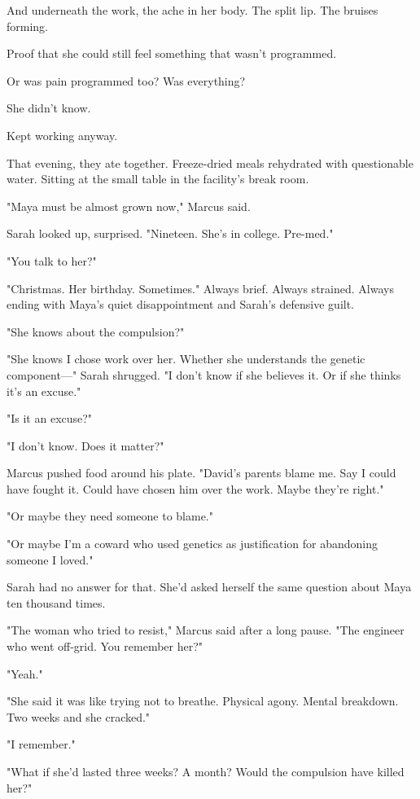 And underneath the work, the ache in her body. The split lip. The bruises forming.

Proof that she could still feel something that wasn't programmed.

Or was pain programmed too? Was everything?

She didn't know.

Kept working anyway.

\scenebreak

That evening, they ate together. Freeze-dried meals rehydrated with questionable water. Sitting at the small table in the facility's break room.

"Maya must be almost grown now," Marcus said.

Sarah looked up, surprised. "Nineteen. She's in college. Pre-med."

"You talk to her?"

"Christmas. Her birthday. Sometimes." Always brief. Always strained. Always ending with Maya's quiet disappointment and Sarah's defensive guilt.

"She knows about the compulsion?"

"She knows I chose work over her. Whether she understands the genetic component—" Sarah shrugged. "I don't know if she believes it. Or if she thinks it's an excuse."

"Is it an excuse?"

"I don't know. Does it matter?"

Marcus pushed food around his plate. "David's parents blame me. Say I could have fought it. Could have chosen him over the work. Maybe they're right."

"Or maybe they need someone to blame."

"Or maybe I'm a coward who used genetics as justification for abandoning someone I loved."

Sarah had no answer for that. She'd asked herself the same question about Maya ten thousand times.

"The woman who tried to resist," Marcus said after a long pause. "The engineer who went off-grid. You remember her?"

"Yeah."

"She said it was like trying not to breathe. Physical agony. Mental breakdown. Two weeks and she cracked."

"I remember."

"What if she'd lasted three weeks? A month? Would the compulsion have killed her?"

